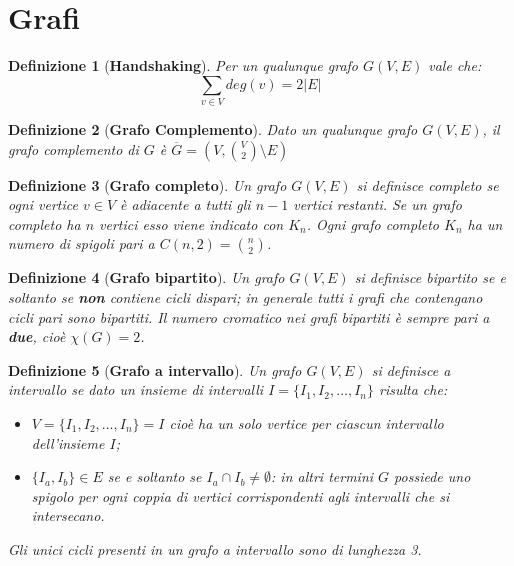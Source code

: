 \documentclass[10pt,a4paper,titlepage]{article}
\theoremstyle{break}
\newtheorem{myDef}{Definizione}
\theoremstyle{break}
\theoremstyle{break}
\begin{document}
\newpage
\section{Grafi}

\begin{myDef}[\textbf{Handshaking}]
Per un qualunque grafo $G(V,E)$ vale che:
\begin{equation}
\sum_{v \in V} deg(v) = 2|E|
\end{equation}
\end{myDef}

\begin{myDef}[\textbf{Grafo Complemento}]
Dato un qualunque grafo $G(V,E)$, il \textit{grafo complemento} di $G$ è $\overline{G}=(V, \binom{V}{2} \setminus E)$
\end{myDef}

\begin{myDef}[\textbf{Grafo completo}]
Un grafo $G(V,E)$ si definisce \textit{completo} se ogni vertice $v \in V$ è adiacente a tutti gli $n-1$ vertici restanti. Se un grafo completo ha $n$ vertici esso viene indicato con $K_n$. Ogni grafo completo $K_n$ ha un numero di spigoli pari a $C(n, 2) = \binom{n}{2}$.
\end{myDef}


\begin{myDef}[\textbf{Grafo bipartito}]
Un grafo $G(V,E)$ si definisce \textit{bipartito} se e soltanto se \textbf{non} contiene \textit{cicli dispari}; in generale tutti i grafi che contengano \textit{cicli pari} sono bipartiti. Il \textit{numero cromatico} nei grafi bipartiti è sempre pari a \textbf{due}, cioè $\chi(G)=2$.
\end{myDef}

\begin{myDef}[\textbf{Grafo a intervallo}]
Un grafo $G(V,E)$ si definisce a \textit{intervallo} se dato un insieme di intervalli $I = \lbrace I_1, I_2, \dotsc, I_n \rbrace$ risulta che:
\begin{itemize}
\item $V = \lbrace I_1, I_2, \dotsc, I_n \rbrace = I$ cioè ha un solo vertice per ciascun intervallo dell'insieme $I$;
\item $\lbrace I_a, I_b \rbrace \in E $ se e soltanto se $I_a \cap I_b \neq \emptyset$: in altri termini $G$ possiede uno spigolo per ogni coppia di vertici corrispondenti agli intervalli che si intersecano. 
\end{itemize}
\item Gli unici cicli presenti in un grafo a intervallo sono di \textit{lunghezza 3}.

\end{myDef}
\end{document}
